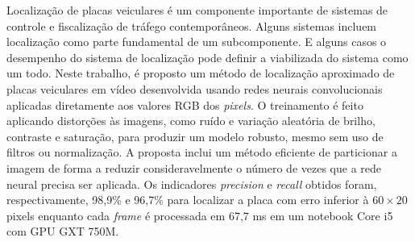 
Localização de placas veiculares é um componente importante de sistemas de
controle e fiscalização de tráfego contemporâneos. Alguns sistemas incluem
localização como parte fundamental de um subcomponente. E alguns casos
o desempenho do sistema de localização pode definir a viabilizada do sistema
como um todo.
Neste trabalho, é proposto um método de localização aproximado de placas
veiculares
em vídeo desenvolvida usando redes neurais convolucionais aplicadas diretamente
aos valores RGB dos \emph{pixels}. O treinamento é feito aplicando distorções
às imagens, como
ruído e variação aleatória de brilho, contraste e saturação, para produzir um
modelo robusto, mesmo sem uso de filtros ou normalização. A proposta inclui um
método eficiente de particionar a imagem de forma a reduzir consideravelmente o
número de vezes que a rede neural precisa ser aplicada. Os indicadores
\emph{precision} e \emph{recall} obtidos foram, respectivamente, 98,9\% e
96,7\% para localizar a placa com erro inferior à $60 \times 20$ pixels
enquanto cada \emph{frame} é processada em 67,7 ms em um notebook Core i5 com
GPU GXT 750M.
